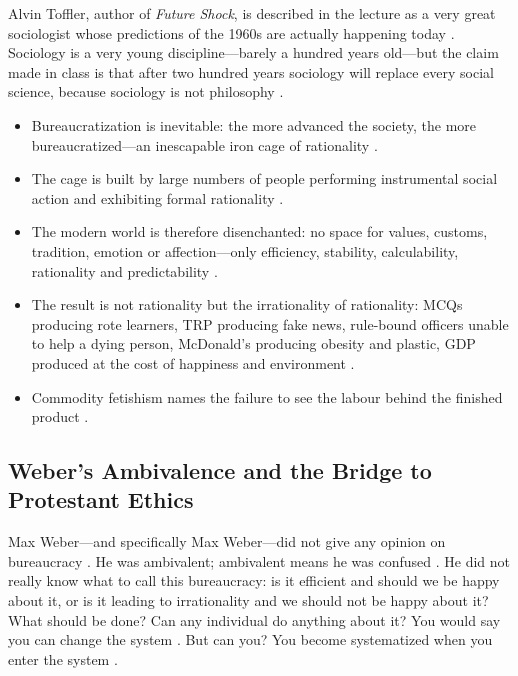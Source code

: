 \begin{PYQLink}
Alvin Toffler, author of \textit{Future Shock}, is described in the lecture as a very great sociologist whose predictions of the 1960s are actually happening today .
Sociology is a very young discipline---barely a hundred years old---but the claim made in class is that after two hundred years sociology will replace every social science, because sociology is not philosophy .
\end{PYQLink}

\begin{QuickRevision}
\begin{itemize}
    \item Bureaucratization is inevitable: the more advanced the society, the more bureaucratized---an inescapable iron cage of rationality .
    \item The cage is built by large numbers of people performing instrumental social action and exhibiting formal rationality .
    \item The modern world is therefore disenchanted: no space for values, customs, tradition, emotion or affection---only efficiency, stability, calculability, rationality and predictability .
    \item The result is not rationality but the irrationality of rationality: MCQs producing rote learners, TRP producing fake news, rule-bound officers unable to help a dying person, McDonald's producing obesity and plastic, GDP produced at the cost of happiness and environment .
    \item Commodity fetishism names the failure to see the labour behind the finished product .
\end{itemize}
\end{QuickRevision}

\subsection{Weber's Ambivalence and the Bridge to Protestant Ethics}

\begin{CriticalPoint}
Max Weber---and specifically Max Weber---did not give any opinion on bureaucracy . He was ambivalent; ambivalent means he was confused .
He did not really know what to call this bureaucracy: is it efficient and should we be happy about it, or is it leading to irrationality and we should not be happy about it? What should be done? Can any individual do anything about it? 
You would say you can change the system . But can you? You become systematized when you enter the system .
\end{CriticalPoint}

